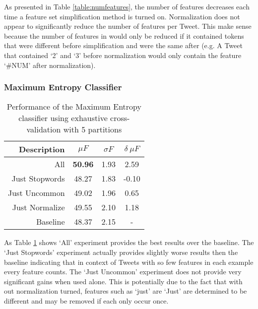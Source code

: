 \documentclass[final,3p,12pt]{elsarticle}
\begin{document}

As presented in Table \ref{table:numfeatures}, the number of features decreases
each time a feature set simplification method is turned on. Normalization does
not appear to significantly reduce the number of features per Tweet. This make
sense because the number of features in would only be reduced if it contained
tokens that were different before simplification and were the same after (e.g.
A Tweet that contained `2' and `3' before normalization would only contain the
feature `\#NUM' after normalization).


\subsubsection{Maximum Entropy Classifier}

\begin{table}[H]
    \begin{center}
    \begin{tabular}{|r||c|c|c|}
        \hline
        Description    & $\mu F$ & $\sigma F$ & $\delta\ \mu F$ \\
        \hline
        All            & \textbf{50.96} & 1.93 &  2.59 \\
        Just Stopwords & 48.27   & 1.83 & -0.10 \\
        Just Uncommon  & 49.02   & 1.96 &  0.65 \\
        Just Normalize & 49.55   & 2.10 &  1.18 \\
        Baseline       & 48.37   & 2.15 & - \\
        \hline
    \end{tabular}
    \end{center}
    \caption{Performance of the Maximum Entropy classifier using exhaustive
    cross-validation with 5 partitions}
    \label{table:maxent-results}
\end{table}

As Table \ref{table:maxent-results} shows `All' experiment provides the best
results over the baseline. The `Just Stopwords' experiment actually provides
slightly worse results then the baseline indicating that in context of Tweets
with so few features in each example every feature counts. The `Just Uncommon'
experiment does not provide very significant gains when used alone. This is
potentially due to the fact that with out normalization turned, features such
as `just' are `Just' are determined to be different and may be removed if each
only occur once.
\end{document}
